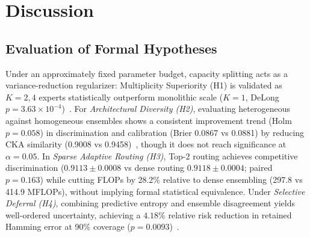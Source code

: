 \documentclass{ICIC2026}
\begin{document}
\begin{table}[t]
\caption{Loss-Term Regularization Ablation Across 3 Seeds}
\label{tab:loss_ablation}
\centering
\begin{ICICtable}
\end{ICICtable}
\end{table}

\section{Discussion}
\label{sec:discussion}

\subsection{Evaluation of Formal Hypotheses}
\label{subsec:disc_hypotheses}

Under an approximately fixed parameter budget, capacity splitting acts as a variance-reduction regularizer: Multiplicity Superiority (H1) is validated as $K = 2, 4$ experts statistically outperform monolithic scale ($K = 1$, DeLong $p = 3.63 \times 10^{-4}$)~\cite{lakshminarayanan2017simple, chen2025budget}. For \textit{Architectural Diversity (H2)}, evaluating heterogeneous against homogeneous ensembles shows a consistent improvement trend (Holm $p = 0.058$) in discrimination and calibration (Brier 0.0867 vs 0.0881) by reducing CKA similarity (0.9008 vs 0.9458)~\cite{zhou2025diversity}, though it does not reach significance at $\alpha = 0.05$. In \textit{Sparse Adaptive Routing (H3)}, Top-2 routing achieves competitive discrimination ($0.9113 \pm 0.0008$ vs dense routing $0.9118 \pm 0.0004$; paired $p = 0.163$) while cutting FLOPs by 28.2\% relative to dense ensembling (297.8 vs 414.9 MFLOPs), without implying formal statistical equivalence. Under \textit{Selective Deferral (H4)}, combining predictive entropy and ensemble disagreement yields well-ordered uncertainty, achieving a $4.18\%$ relative risk reduction in retained Hamming error at 90\% coverage ($p = 0.0093$)~\cite{kompa2024second, argha2025selective}.
\end{document}
